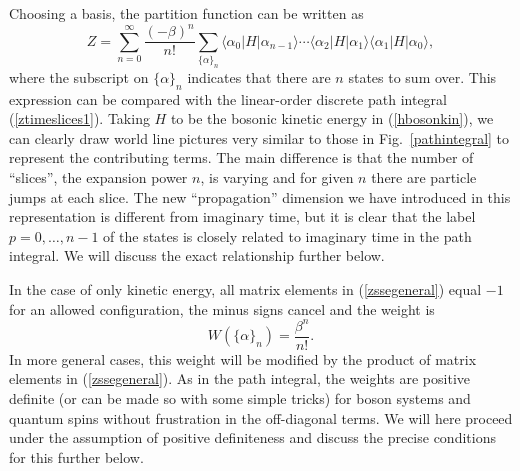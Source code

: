 \documentclass[draft,numberedheadings]{aipproc}
\begin{document}
Choosing a basis, the partition function can be written as
\begin{equation}
Z = \sum_{n=0}^\infty \frac{(-\beta)^n}{n!}
\sum_{\{\alpha\}_n} \langle \alpha_0|H|\alpha_{n-1}\rangle \cdots \langle \alpha_2 |H|\alpha_1\rangle\langle \alpha_1 |H|\alpha_0\rangle, 
\label{zssegeneral}
\end{equation}
where the subscript on $\{\alpha\}_n$ indicates that there are $n$ states to sum over. This expression can be compared with the linear-order discrete path 
integral (\ref{ztimeslices1}). Taking $H$ to be the bosonic kinetic energy in (\ref{hbosonkin}), we can clearly draw world line pictures very similar to those 
in Fig.~\ref{pathintegral} to represent the contributing terms. The main difference is that the number of ``slices'', the expansion power $n$, is varying and 
for given $n$ there are particle jumps at each slice. The new ``propagation'' dimension we have introduced in this representation is different from imaginary time, 
but it is clear that the label $p=0,\ldots,n-1$ of the states is closely related to imaginary time in the path integral. We will discuss the exact relationship 
further below.

In the case of only kinetic energy, all matrix elements in (\ref{zssegeneral}) equal $-1$ for an allowed configuration, the minus signs cancel and the weight is
\begin{equation}
W(\{\alpha\}_n)=\frac{\beta^n}{n!}.
\end{equation}
In more general cases, this weight will be modified by the product of matrix elements in (\ref{zssegeneral}). As in the path integral, the weights are 
positive definite (or can be made so with some simple tricks) for boson systems and quantum spins without frustration in the off-diagonal terms. We will here 
proceed under the assumption of positive definiteness and discuss the precise conditions for this further below.
\end{document}
